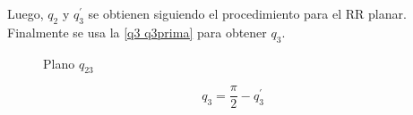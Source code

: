 \documentclass[a4paper,12pt]{article}
\begin{document}
Luego, $q_2$ y $q_3^{\prime}$ se obtienen siguiendo el procedimiento para el RR planar. Finalmente se usa la \cref{q3 q3prima} para obtener $q_3$.

\begin{figure}[H]
    \centering
    \begin{adjustbox}{max width=\columnwidth}
    \end{adjustbox}
    \caption{Plano $q_{23}$}
    \label{q23}
\end{figure}

\begin{equation}
    q_3= \frac{\pi}{2} - q_3^{\prime}
    \label{q3 q3prima}
\end{equation}






\end{document}
